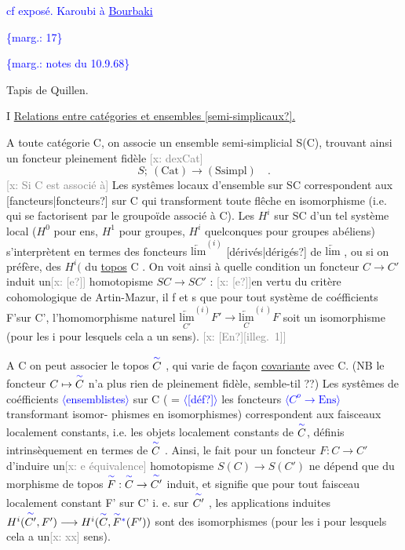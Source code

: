 \documentclass[11pt]{article}
\newcommand{\scanpage}[1]{\par\bigskip\noindent{\small\sffamily[scan #1]}\par}
\newcommand{\hand}[1]{\textcolor{blue}{#1}}
\newcommand{\inserted}[2][]{\textcolor{blue}{$\langle$#2$\rangle$}}
\newcommand{\margin}[1]{\textcolor{blue}{\{\textsf{marg.:} #1\}}}
\newcommand{\xout}[1]{\textcolor{gray}{[\textsf{x:} #1]}}
\newcommand{\uline}[1]{\underline{#1}}
\newcommand{\unsure}[1]{[#1?]}
\newcommand{\illegible}[1]{[\textsf{illeg.\ #1}]}
\begin{document}
\hand{cf exposé. Karoubi à \uline{Bourbaki}}

\margin{17}

\clearpage
\scanpage{162-5/32}
\margin{notes du 10.9.68}

Tapis de Quillen.

I \quad \uline{Relations entre catégories et ensembles \unsure{semi-simplicaux}.}

A toute catégorie C,  on associe un ensemble semi-simplicial S(C),
trouvant ainsi un foncteur pleinement fidèle \xout{dexCat}
\[ S; \ (\mathrm{Cat}) \longrightarrow (\mathrm{Ssimpl}) \quad . \]
\xout{Si C est associé à} Les systêmes locaux d'ensemble sur SC correspondent
aux \unsure{fancteurs|foncteurs} sur C qui transforment toute flêche en isomorphisme (i.e.
qui se factorisent par le groupoïde associé à  C). Les $H^i$ sur SC d'un tel
système local ($H^0$ pour ens, $H^1$ pour groupes, $H^i$ quelconques pour groupes
abéliens) s'interprètent en termes des foncteurs $\underleftarrow{\mathrm{lim}}^{(i)}$ \unsure{dérivés|dérigés} de $\underleftarrow{\mathrm{lim}}$ ,
ou si on préfère, des $H^i($ du \uline{topos} C . On voit ainsi à quelle condition
un foncteur  $C \to C'$ induit un\xout{\unsure{e}}  homotopisme  $SC \to SC'$ :  \xout{\unsure{e}}en vertu du
critère cohomologique de Artin-Mazur, il f et s que  pour tout système
de coéfficients  F'sur C', l'homomorphisme naturel $\underset{C'}{\underleftarrow{\mathrm{lim}}}^{(i)}F' \longrightarrow \underset{C}{\underleftarrow{\mathrm{lim}}}^{(i\ )}F$
soit un isomorphisme (pour les i pour lesquels cela a un sens). \xout{\unsure{En}\illegible{1}}

A C on peut associer le topos $\overset{\hand{\sim}}{C}$ , qui varie de façon \uline{covariante} avec C.
(NB le foncteur $C \mapsto \overset{\hand{\sim}}{C}$  n'a plus rien de pleinement fidèle, semble-til ??)
Les systêmes de coéfficients \inserted[typed]{ensemblistes} sur C ( = \inserted[typed]{\unsure{déf}} les foncteurs \inserted[typed]{$C^o \longrightarrow \mathrm{Ens}$} transformant isomor-%
phismes en isomorphismes) correspondent aux faisceaux localement constants,
i.e. les objets localement constants de $\overset{\hand{\sim}}{C}$, définis intrinsèquement en termes
de $\overset{\hand{\sim}}{C}$ .  Ainsi, le fait pour un foncteur $F:C \to C'$ d'induire un\xout{e équivalence}
homotopisme $S(C) \to S(C')$  ne  dépend que du morphisme de topos $\overset{\hand{\sim}}{F}: \overset{\hand{\sim}}{C} \to \overset{\hand{\sim}}{C'}$
induit, et signifie que pour tout faisceau localement constant F' sur C' i.
e. sur $\overset{\hand{\sim}}{C'}$ ,  les applications induites  $H^i(\overset{\hand{\sim}}{C'},F') \longrightarrow H^i(\overset{\hand{\sim}}{C},\overset{\hand{\sim}}{F}{}^{\hand{*}}(F'))$
sont des isomorphismes (pour les i pour lesquels cela a un\xout{xx} sens).
\end{document}
